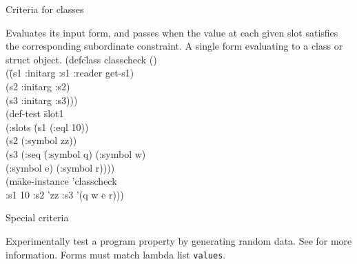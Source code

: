 \begin{criteriaGroup}{Criteria for classes}{}

{Evaluates its input form, and passes when the value at each given
slot satisfies the corresponding subordinate constraint.}
{A single form evaluating to a class or struct object.}
{}
{\tabbingEx}{
(defc\=lass classcheck ()
\\ \> (\=(s1 :initarg :s1 :reader get-s1)
\\ \> \> (s2 :initarg :s2)
\\ \> \> (s3 :initarg :s3)))
\\ (def-test \=slot1
\\ \>  (:slots \=(s1 (:eql 10))
\\ \>  \>(s2 (:symbol zz))
\\ \>  \>(s3 (:seq \=(:symbol q) (:symbol w)
\\ \>  \> \> (:symbol e) (:symbol r))))
\\ \>  (m\=ake-instance 'classcheck
\\ \> \>  :s1 10 :s2 'zz :s3 '(q w e r)))
}

\end{criteriaGroup}

\begin{criteriaGroup}{Special criteria}{}

{Experimentally test a program property by generating random data.  See  for more information.}
{Forms must match lambda list \texttt{values}.}
{\noExpl}{\noEx}{}

\end{criteriaGroup}

